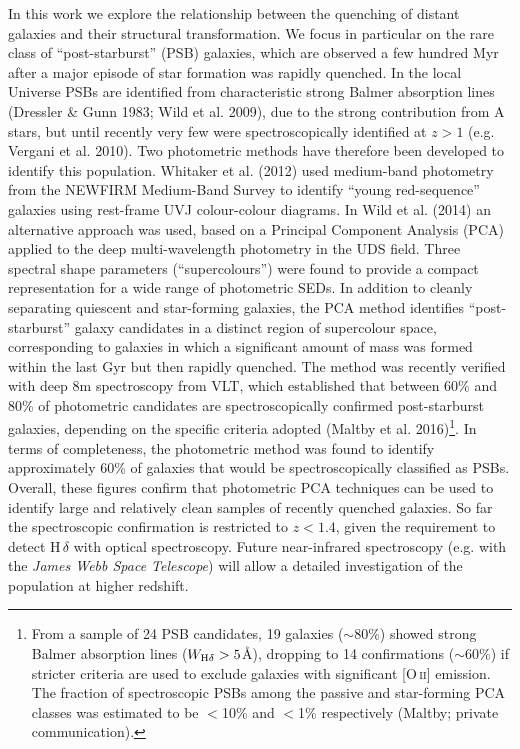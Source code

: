 \documentclass[a4paper,fleqn,usenatbib,useAMS]{mnras}
\begin{document}
In this work we explore the relationship between the quenching of
distant galaxies and their structural transformation.  We focus in
particular on the rare class of ``post-starburst'' (PSB) galaxies,
which are observed a few hundred Myr after a major episode of star
formation was rapidly quenched.  In the local Universe PSBs are
identified from characteristic strong Balmer absorption lines
(Dressler \& Gunn 1983; Wild et al. 2009), due to the strong
contribution from A stars, but until recently very few were
spectroscopically identified at $z>1$ (e.g.  Vergani et al. 2010).
Two photometric methods have therefore been developed to identify this
population. Whitaker et al.  (2012) used medium-band photometry from
the NEWFIRM Medium-Band Survey to identify ``young red-sequence''
galaxies using rest-frame UVJ colour-colour diagrams.  In Wild et al.
(2014) an alternative approach was used, based on a Principal Component
Analysis (PCA) applied to the deep multi-wavelength photometry in the
UDS field.  Three spectral shape parameters (``supercolours'') were
found to provide a compact representation for a wide range of
photometric SEDs.  In addition to cleanly separating quiescent and
star-forming galaxies, the PCA method identifies ``post-starburst''
galaxy candidates in a distinct region of supercolour space,
corresponding to galaxies in which a significant amount of mass was
formed within the last Gyr but then rapidly quenched.  The method was
recently verified with deep 8m spectroscopy from VLT, which
established that between 60\% and 80\% of photometric candidates are
spectroscopically confirmed post-starburst galaxies, depending on the
specific criteria adopted (Maltby et al. 2016)\footnote{From a sample
  of 24 PSB candidates, 19 galaxies ($\sim$80\%) showed strong Balmer
  absorption lines ($W_{\rm H\delta}>5$\AA), dropping to 14
  confirmations ($\sim$60\%) if stricter criteria are used to exclude
  galaxies with significant [O\,\textsc{ii}] emission.  The fraction
  of spectroscopic PSBs among the passive and star-forming PCA classes
  was estimated to be $<$10\% and $<$1\% respectively (Maltby; private
  communication).}.  In terms of completeness, the photometric method
was found to identify approximately 60\% of galaxies that would be
spectroscopically classified as PSBs.  Overall, these figures confirm
that photometric PCA techniques can be used to identify large and
relatively clean samples of recently quenched galaxies.  So far the
spectroscopic confirmation is restricted to $z<1.4$, given the
requirement to detect H\,$\delta$ with optical spectroscopy.  Future
near-infrared spectroscopy (e.g. with the {\it James Webb Space
  Telescope}) will allow a detailed investigation of the population at
higher redshift.
\end{document}
